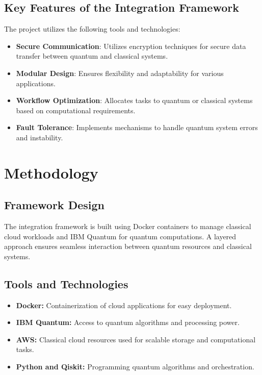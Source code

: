 \documentclass[12pt,a4paper]{article}
\begin{document}
\subsection{Key Features of the Integration Framework}
The project utilizes the following tools and technologies:
\begin{itemize}
    \item \textbf{Secure Communication}: Utilizes encryption techniques for secure data transfer between quantum and classical systems.
    \item \textbf{Modular Design}: Ensures flexibility and adaptability for various applications.
    \item \textbf{Workflow Optimization}: Allocates tasks to quantum or classical systems based on computational requirements.
    \item \textbf{Fault Tolerance}: Implements mechanisms to handle quantum system errors and instability.
    
\end{itemize}

\section{Methodology}
\subsection{Framework Design}
The integration framework is built using Docker containers to manage classical cloud workloads and IBM Quantum for quantum computations. A layered approach ensures seamless interaction between quantum resources and classical systems.

\subsection{Tools and Technologies}
\begin{itemize}
    \item \textbf{Docker:} Containerization of cloud applications for easy deployment.
    \item \textbf{IBM Quantum:} Access to quantum algorithms and processing power.
    \item \textbf{AWS:} Classical cloud resources used for scalable storage and computational tasks.
    \item \textbf{Python and Qiskit:} Programming quantum algorithms and orchestration.
\end{itemize}
\end{document}
